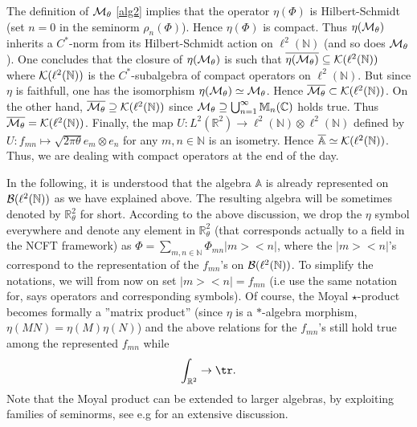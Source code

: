 \documentclass[a4paper]{jpconf}
\numberwithin{equation}{section}
\theoremstyle{nonumberplain}
\begin{document}
The definition of ${\cal{M}}_\theta$ \eqref{alg2} implies that the operator $\eta(\Phi)$ is Hilbert-Schmidt (set $n=0$ in the seminorm $\rho_n(\Phi)$). Hence $\eta(\Phi)$ is compact. Thus $\eta({\cal{M}}_\theta)$ inherits a $C^*$-norm from its Hilbert-Schmidt action on $\ell^2(\mathbb{N})$ (and so does ${\cal{M}}_\theta$). One concludes that the closure of $\eta({\cal{M}}_\theta)$ is such that $\overline{\eta({\cal{M}}_\theta)}\subseteq{\cal{K}}(\ell^2(\mathbb{N}))$ where ${\cal{K}}(\ell^2(\mathbb{N}))$ is the $C^*$-subalgebra of compact operators on $\ell^2(\mathbb{N})$. But since $\eta$ is faithfull, one has the isomorphism $\eta({\cal{M}}_\theta)\simeq{\cal{M}}_\theta$. Hence $\overline{{\cal{M}}_\theta}\subset{\cal{K}}(\ell^2(\mathbb{N}))$. On the other hand, $\overline{{\cal{M}}_\theta}\supseteq{\cal{K}}(\ell^2(\mathbb{N}))$ since ${\cal{M}}_\theta\supseteq\bigcup_{n=1}^\infty{\mathbb{M}}_n(\mathbb{C})$ holds true. Thus $\overline{{\cal{M}}_\theta}={\cal{K}}(\ell^2(\mathbb{N}))$. Finally, the map $U:L^2(
\mathbb{R}^2)\to\ell^2(\mathbb{N})\otimes\ell^2(\mathbb{N})$ defined by $U:f_{mn}\mapsto {\sqrt{2\pi\theta}}e_m\otimes e_n$ for any $m,n\in\mathbb{N}$ is an isometry. Hence $\overline{{\mathbb{A}}}\simeq{\cal{K}}(\ell^2(\mathbb{N}))$. Thus, we are dealing with compact operators at the end of the day.\par

In the following, it is understood that the algebra ${\mathbb{A}}$ is already represented on ${\cal{B}}(\ell^2(\mathbb{N}))$ as we have explained above. The resulting algebra will be sometimes denoted by $\mathbb{R}^2_\theta$ for short. According to the above discussion, we drop the $\eta$ symbol everywhere and denote any element in $\mathbb{R}^2_\theta$ (that corresponds actually to a field in the NCFT framework) as $\Phi=\sum_{m,n\in\mathbb{N}}\Phi_{mn}|m><n|$, where the $|m><n|$'s correspond to the representation of the $f_{mn}$'s on ${\cal{B}}(\ell^2(\mathbb{N}))$. To simplify the notations, we will from now on set $|m><n|=f_{mn}$ (i.e use the same notation for, says operators and corresponding symbols). Of course, the Moyal $\star$-product becomes formally a ''matrix product'' (since $\eta$ is a $*$-algebra morphism, $\eta(MN)=\eta(M)\eta(N)$) and the above relations for the $f_{mn}$'s still hold true among the represented $f_{mn}$ while 
\begin{equation}
\int_{\mathbb{R}^2}\to\tr. \nonumber
\end{equation}
Note that the Moyal product can be extended to larger algebras, by exploiting families of seminorms, see e.g \cite{Gracia-Bondia:1987kw} for an extensive discussion.\par
\end{document}
